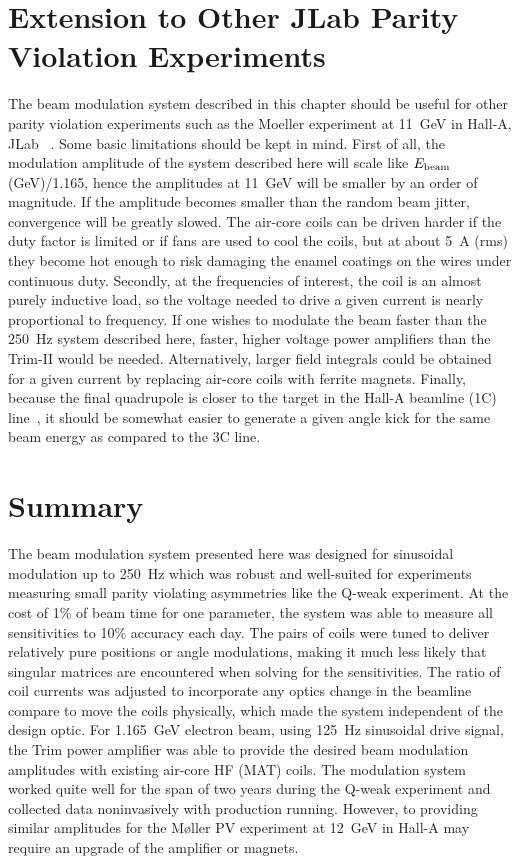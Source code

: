 \section{Extension to Other JLab Parity Violation Experiments}
\label{Extension to Other JLab Parity Violation Experiments}
The beam modulation system described in this chapter should be useful for other parity violation experiments such as the Moeller experiment at 11~GeV in Hall-A, JLab ~\cite{moller_2010}. Some basic limitations should be kept in mind. First of all, the modulation amplitude of the system described here will scale like $E_{\rm beam}$ (GeV)/1.165, hence the amplitudes at 11~GeV will be smaller by an order of magnitude. If the amplitude becomes smaller than the random beam jitter, convergence will be greatly slowed. The air-core coils can be driven harder if the duty factor is limited or if fans are used to cool the coils, but at about 5~A (rms) they become hot enough to risk damaging the enamel coatings on the wires under continuous duty. Secondly, at the frequencies of interest, the coil is an almost purely inductive load, so the voltage needed to drive a given current is nearly proportional to frequency. If one wishes to modulate the beam faster than the 250~Hz system described here, faster, higher voltage power amplifiers than the Trim-II would be needed. Alternatively, larger field integrals could be obtained for a given current by replacing air-core coils with ferrite magnets. Finally, because the final quadrupole is closer to the target in the Hall-A beamline (1C) line~\cite{nur_halla_beamline}, it should be somewhat easier to generate a given angle kick for the same beam energy as compared to the 3C line. 

\section{Summary}
\label{Summary}
The beam modulation system presented here was designed for sinusoidal modulation up to 250~Hz which was robust and well-suited for experiments measuring small parity violating asymmetries like the Q-weak experiment. At the cost of 1\% of beam time for one parameter, the system was able to measure all sensitivities to 10\% accuracy each day. The pairs of coils were tuned to deliver relatively pure positions or angle modulations, making it much less likely that singular matrices are encountered when solving for the sensitivities. The ratio of coil currents was adjusted to incorporate any optics change in the beamline compare to move the coils physically, which made the system independent of the design optic. For 1.165~GeV electron beam, using 125~Hz sinusoidal drive signal, the Trim power amplifier was able to provide the desired beam modulation amplitudes with existing air-core HF (MAT) coils. The modulation system worked quite well for the span of two years during the Q-weak experiment and collected data noninvasively with production running. However, to providing similar amplitudes for the M{\o}ller PV experiment at 12~GeV in Hall-A may require an upgrade of the amplifier or magnets. 

